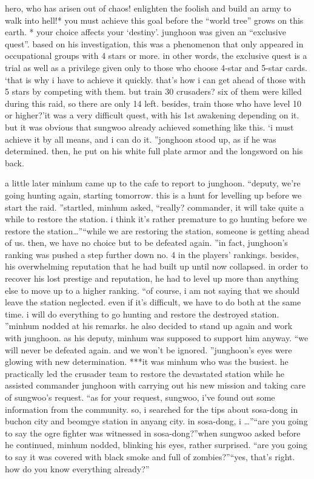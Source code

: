 hero, who has arisen out of chaos! enlighten the foolish and build an army to walk into hell!* you must achieve this goal before the “world tree” grows on this earth.
* your choice affects your ‘destiny’.
junghoon was given an “exclusive quest”.
 based on his investigation, this was a phenomenon that only appeared in occupational groups with 4 stars or more.
in other words, the exclusive quest is a trial as well as a privilege given only to those who choose 4-star and 5-star cards.
‘that is why i have to achieve it quickly.
 that’s how i can get ahead of those with 5 stars by competing with them.
 but train 30 crusaders? six of them were killed during this raid, so there are only 14 left.
 besides, train those who have level 10 or higher?’it was a very difficult quest, with his 1st awakening depending on it.
 but it was obvious that sungwoo already achieved something like this.
‘i must achieve it by all means, and i can do it.
”jonghoon stood up, as if he was determined.
 then, he put on his white full plate armor and the longsword on his back.


a little later minhum came up to the cafe to report to junghoon.
“deputy, we’re going hunting again, starting tomorrow.
 this is a hunt for levelling up before we start the raid.
”startled, minhum asked, “really? commander, it will take quite a while to restore the station.
 i think it’s rather premature to go hunting before we restore the station…”“while we are restoring the station, someone is getting ahead of us.
 then, we have no choice but to be defeated again.
”in fact, junghoon’s ranking was pushed a step further down no.
 4 in the players’ rankings.
besides, his overwhelming reputation that he had built up until now collapsed.
 in order to recover his lost prestige and reputation, he had to level up more than anything else to move up to a higher ranking.
“of course, i am not saying that we should leave the station neglected.
 even if it’s difficult, we have to do both at the same time.
 i will do everything to go hunting and restore the destroyed station.
”minhum nodded at his remarks.
 he also decided to stand up again and work with junghoon.
as his deputy, minhum was supposed to support him anyway.
“we will never be defeated again.
 and we won’t be ignored.
”junghoon’s eyes were glowing with new determination.
***it was minhum who was the busiest.
 he practically led the crusader team to restore the devastated station while he assisted commander junghoon with carrying out his new mission and taking care of sungwoo’s request.
“as for your request, sungwoo, i’ve found out some information from the community.
 so, i searched for the tips about sosa-dong in buchon city and beomgye station in anyang city.
 in sosa-dong, i …”“are you going to say the ogre fighter was witnessed in sosa-dong?”when sungwoo asked before he continued, minhum nodded, blinking his eyes, rather surprised.
“are you going to say it was covered with black smoke and full of zombies?”“yes, that’s right.
 how do you know everything already?”

 